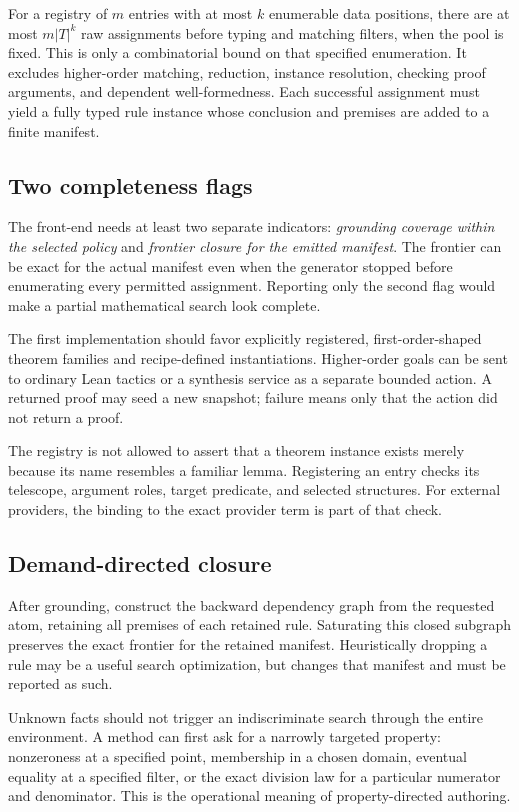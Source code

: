 \documentclass[11pt,a4paper]{article}
\theoremstyle{definition}\newtheorem{definition}[theorem]{Definition}
\theoremstyle{remark}\newtheorem{remark}[theorem]{Remark}
\begin{document}
For a registry of $m$ entries with at most $k$ enumerable data positions, there are at most $m|T|^k$ raw assignments before typing and matching filters, when the pool is fixed. This is only a combinatorial bound on that specified enumeration. It excludes higher-order matching, reduction, instance resolution, checking proof arguments, and dependent well-formedness. Each successful assignment must yield a fully typed rule instance whose conclusion and premises are added to a finite manifest.

\subsection{Two completeness flags}
The front-end needs at least two separate indicators: \emph{grounding coverage within the selected policy} and \emph{frontier closure for the emitted manifest}. The frontier can be exact for the actual manifest even when the generator stopped before enumerating every permitted assignment. Reporting only the second flag would make a partial mathematical search look complete.

The first implementation should favor explicitly registered, first-order-shaped theorem families and recipe-defined instantiations. Higher-order goals can be sent to ordinary Lean tactics or a synthesis service as a separate bounded action. A returned proof may seed a new snapshot; failure means only that the action did not return a proof.

The registry is not allowed to assert that a theorem instance exists merely because its name resembles a familiar lemma. Registering an entry checks its telescope, argument roles, target predicate, and selected structures. For external providers, the binding to the exact provider term is part of that check.

\subsection{Demand-directed closure}
After grounding, construct the backward dependency graph from the requested atom, retaining all premises of each retained rule. Saturating this closed subgraph preserves the exact frontier for the retained manifest. Heuristically dropping a rule may be a useful search optimization, but changes that manifest and must be reported as such.

Unknown facts should not trigger an indiscriminate search through the entire environment. A method can first ask for a narrowly targeted property: nonzeroness at a specified point, membership in a chosen domain, eventual equality at a specified filter, or the exact division law for a particular numerator and denominator. This is the operational meaning of property-directed authoring.
\end{document}

